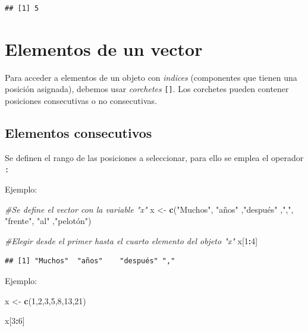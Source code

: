 \documentclass[
]{book}
\newenvironment{Shaded}{\begin{snugshade}}{\end{snugshade}}
\newcommand{\CommentTok}[1]{\textcolor[rgb]{0.56,0.35,0.01}{\textit{#1}}}
\newcommand{\DecValTok}[1]{\textcolor[rgb]{0.00,0.00,0.81}{#1}}
\newcommand{\FunctionTok}[1]{\textcolor[rgb]{0.13,0.29,0.53}{\textbf{#1}}}
\newcommand{\NormalTok}[1]{#1}
\newcommand{\OtherTok}[1]{\textcolor[rgb]{0.56,0.35,0.01}{#1}}
\newcommand{\SpecialCharTok}[1]{\textcolor[rgb]{0.81,0.36,0.00}{\textbf{#1}}}
\newcommand{\StringTok}[1]{\textcolor[rgb]{0.31,0.60,0.02}{#1}}
\begin{document}
\begin{verbatim}
## [1] 5
\end{verbatim}

\section{Elementos de un vector}\label{elementos-de-un-vector}

Para acceder a elementos de un objeto con \emph{indices} (componentes que tienen una posición asignada), debemos usar \emph{corchetes} \texttt{{[}{]}}. Los corchetes pueden contener posiciones consecutivas o no consecutivas.

\subsection{Elementos consecutivos}\label{elementos-consecutivos}

Se definen el rango de las posiciones a seleccionar, para ello se emplea el operador \texttt{:}

Ejemplo:

\begin{Shaded}
\begin{Highlighting}[]
\CommentTok{\#Se define el vector con la variable "x"}
\NormalTok{x }\OtherTok{\textless{}{-}} \FunctionTok{c}\NormalTok{(}\StringTok{"Muchos"}\NormalTok{, }\StringTok{"años"}\NormalTok{ ,}\StringTok{"después"}\NormalTok{ ,}\StringTok{","}\NormalTok{, }\StringTok{"frente"}\NormalTok{, }\StringTok{"al"}\NormalTok{ ,}\StringTok{"pelotón"}\NormalTok{)}

\CommentTok{\#Elegir desde el primer hasta el cuarto elemento del objeto "x"}
\NormalTok{x[}\DecValTok{1}\SpecialCharTok{:}\DecValTok{4}\NormalTok{]}
\end{Highlighting}
\end{Shaded}

\begin{verbatim}
## [1] "Muchos"  "años"    "después" ","
\end{verbatim}

Ejemplo:

\begin{Shaded}
\begin{Highlighting}[]
\NormalTok{x }\OtherTok{\textless{}{-}} \FunctionTok{c}\NormalTok{(}\DecValTok{1}\NormalTok{,}\DecValTok{2}\NormalTok{,}\DecValTok{3}\NormalTok{,}\DecValTok{5}\NormalTok{,}\DecValTok{8}\NormalTok{,}\DecValTok{13}\NormalTok{,}\DecValTok{21}\NormalTok{)}

\NormalTok{x[}\DecValTok{3}\SpecialCharTok{:}\DecValTok{6}\NormalTok{]}
\end{Highlighting}
\end{Shaded}
\end{document}
